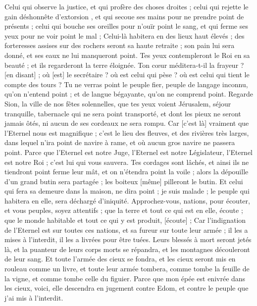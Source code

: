 \begin{multicols}{2}
Celui qui observe la justice, et qui profère des choses droites ; celui qui rejette le gain déshonnête d'extorsion , et qui secoue ses mains pour ne prendre point de présents ; celui qui bouche ses oreilles pour n'ouïr point le sang, et qui ferme ses yeux pour ne voir point le mal ;
Celui-là habitera en des lieux haut élevés ; des forteresses assises sur des rochers seront sa haute retraite ; son pain lui sera donné, et ses eaux ne lui manqueront point.
Tes yeux contempleront le Roi en sa beauté ; et ils regarderont la terre éloignée.
Ton cœur méditera-t-il la frayeur ? [en disant] ; où [est] le secrétaire ? où est celui qui pèse ? où est celui qui tient le compte des tours ?
Tu ne verras point le peuple fier, peuple de langage inconnu, qu'on n'entend point ; et de langue bégayante, qu'on ne comprend point.
Regarde Sion, la ville de nos fêtes solennelles, que tes yeux voient Jérusalem, séjour tranquille, tabernacle qui ne sera point transporté, et dont les pieux ne seront jamais ôtés, ni aucun de ses cordeaux ne sera rompu.
Car [c'est là] vraiment que l'Eternel nous est magnifique ; c'est le lieu des fleuves, et des rivières très larges, dans lequel n'ira point de navire à rame, et où aucun gros navire ne passera point.
Parce que l'Eternel est notre Juge, l'Eternel est notre Législateur, l'Eternel est notre Roi ; c'est lui qui vous sauvera.
Tes cordages sont lâchés, et ainsi ils ne tiendront point ferme leur mât, et on n'étendra point la voile ; alors la dépouille d'un grand butin sera partagée ; les boiteux [même] pilleront le butin.
Et celui qui fera sa demeure dans la maison, ne dira point ; je suis malade ; le peuple qui habitera en elle, sera déchargé d'iniquité.
\VerseOne{}Approchez-vous, nations, pour écouter, et vous peuples, soyez attentifs ; que la terre et tout ce qui est en elle, écoute ; que le monde habitable et tout ce qui y est produit, [écoute] ;
Car l'indignation de l'Eternel est sur toutes ces nations, et sa fureur sur toute leur armée ; il les a mises à l'interdit, il les a livrées pour être tuées.
Leurs blessés à mort seront jetés là, et la puanteur de leurs corps morts se répandra, et les montagnes découleront de leur sang.
Et toute l'armée des cieux se fondra, et les cieux seront mis en rouleau comme un livre, et toute leur armée tombera, comme tombe la feuille de la vigne, et comme tombe celle du figuier.
Parce que mon épée est enivrée dans les cieux, voici, elle descendra en jugement contre Edom, et contre le peuple que j'ai mis à l'interdit.

\end{multicols}
